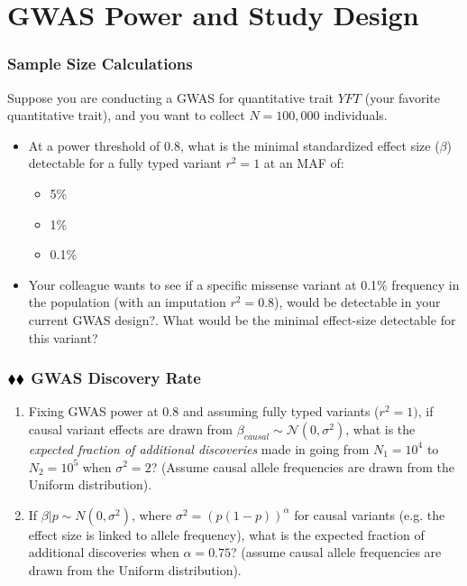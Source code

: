 \documentclass{pset}
\date{7/7/2025}
\begin{document}
\maketitle

\section*{GWAS Power and Study Design}

\subsubsection*{Sample Size Calculations}

Suppose you are conducting a GWAS for quantitative trait $YFT$ (your favorite quantitative trait), and you want to collect $N=100,000$ individuals. 

\begin{itemize}
	\item At a power threshold of $0.8$, what is the minimal standardized effect size ($\beta$) detectable for a fully typed variant $r^2 = 1$ at an MAF of: 
	\begin{itemize}
		\item 5\% 
		\item 1\%
		\item 0.1\%
	\end{itemize}
	\item Your colleague wants to see if a specific missense variant at 0.1\% frequency in the population (with an imputation $r^2 = 0.8$), would be detectable in your current GWAS design?. What would be the minimal effect-size detectable for this variant?  
\end{itemize}

\subsubsection*{$\mathbin{\blacklozenge}\mathbin{\blacklozenge}$ GWAS Discovery Rate} 

\begin{enumerate}
\item Fixing GWAS power at $0.8$ and assuming fully typed variants ($r^2 = 1)$, if causal variant effects are drawn from $\beta_{causal} \sim \mathcal{N}(0,\sigma^2)$, what is the \textit{expected fraction of additional discoveries} made in going from $N_1 = 10^4$ to $N_2 = 10^5$ when $\sigma^2 = 2$? (Assume causal allele frequencies are drawn from the Uniform distribution). 
	
\item If $\beta | p \sim N(0, \sigma^2)$, where $\sigma^2 = \left(p(1-p)\right)^{\alpha}$ for causal variants (e.g. the effect size is linked to allele frequency), what is the expected fraction of additional discoveries when $\alpha = 0.75$? (assume causal allele frequencies are drawn from the Uniform distribution).
\end{enumerate}
\end{document}
